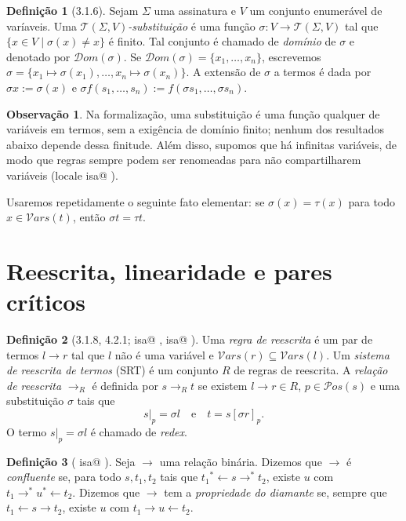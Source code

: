 \documentclass[a4paper]{article}
\makeatletter
\newcommand{\vars}[1]{\mathcal{V}ars(#1)}
\newcommand{\pos}[1]{\mathcal{P}os(#1)}
\newcommand{\terms}[2]{\mathcal{T}(#1, #2)}
\newcommand{\termpos}[1]{|_{#1}}
\newcommand{\subpos}[2]{[#1]_{#2}}
\newcommand{\dom}[1]{\mathcal{D}om(#1)}
\newcommand{\isa}[1]{\textup{%
  \ifcsname isa@\detokenize{#1}\endcsname
    \href{\csname isa@\detokenize{#1}\endcsname}{\texttt{\detokenize{#1}}}%
  \else
    \texttt{\detokenize{#1}}%
  \fi}}
\theoremstyle{definition}
\newtheorem{definition}{Definição}
\newtheorem*{remark}{Observação}
\theoremstyle{plain}
\makeatother
\begin{document}
	\begin{definition}[3.1.6]
		Sejam \(\Sigma\) uma assinatura e \(V\) um conjunto enumerável de varíaveis. Uma {\em \(\terms{\Sigma}{V}\)-substituição} é uma função \(\sigma \colon V \to \terms{\Sigma}{V}\) tal que \(\{x \in V \mid \sigma(x) \neq x\}\) é finito. Tal conjunto é chamado de {\em domínio} de \(\sigma\) e denotado por \(\dom{\sigma}\). Se \(\dom{\sigma}=\{x_1, \ldots, x_n\}\), escrevemos \(\sigma = \{x_1 \mapsto \sigma(x_1), \ldots, x_n \mapsto \sigma(x_n)\}\). A extensão de \(\sigma\) a termos é dada por \(\sigma x := \sigma(x)\) e \(\sigma f(s_1, \ldots, s_n) := f(\sigma s_1, \ldots, \sigma s_n)\).
	\end{definition}

	\begin{remark}
		Na formalização, uma substituição é uma função qualquer de variáveis em termos, sem a exigência de domínio finito; nenhum dos resultados abaixo depende dessa finitude. Além disso, supomos que há infinitas variáveis, de modo que regras sempre podem ser renomeadas para não compartilharem variáveis (locale \isa{TRS_inf}).
	\end{remark}

	Usaremos repetidamente o seguinte fato elementar: se \(\sigma(x) = \tau(x)\) para todo \(x \in \vars{t}\), então \(\sigma t = \tau t\).

\section{Reescrita, linearidade e pares críticos}

	\begin{definition}[3.1.8, 4.2.1; \isa{rstep}, \isa{rewrite_rule}]
		Uma {\em regra de reescrita} é um par de termos \(l \rightarrow r\) tal que \(l\) não é uma variável e \(\vars{r} \subseteq \vars{l}\). Um {\em sistema de reescrita de termos} (SRT) é um conjunto \(R\) de regras de reescrita. A {\em relação de reescrita} \(\rightarrow_R\) é definida por \(s \rightarrow_R t\) se existem \(l \rightarrow r \in R\), \(p \in \pos{s}\) e uma substituição \(\sigma\) tais que
			\[s\termpos{p} = \sigma l \quad\text{e}\quad t = s\subpos{\sigma r}{p}.\]
		O termo \(s\termpos{p} = \sigma l\) é chamado de {\em redex}.
	\end{definition}

	\begin{definition}[\isa{diamond}]
		Seja \(\rightarrow\) uma relação binária. Dizemos que \(\rightarrow\) é {\em confluente} se, para todo \(s, t_1, t_2\) tais que \(t_1 \mathrel{{}^*{\leftarrow}} s \rightarrow^* t_2\), existe \(u\) com \(t_1 \rightarrow^* u \mathrel{{}^*{\leftarrow}} t_2\). Dizemos que \(\rightarrow\) tem a {\em propriedade do diamante} se, sempre que \(t_1 \leftarrow s \rightarrow t_2\), existe \(u\) com \(t_1 \rightarrow u \leftarrow t_2\).
	\end{definition}
\end{document}
